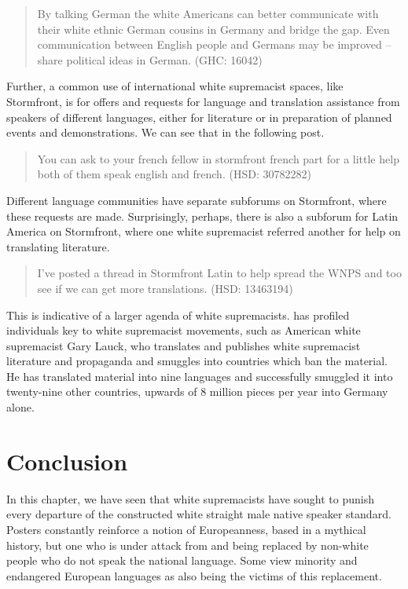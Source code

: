 \documentclass[output=paper,colorlinks,citecolor=brown]{langscibook}
\begin{document}
\begin{quote}
By talking German the white Americans can better communicate with their white ethnic German cousins in Germany and bridge the gap. Even communication between English people and Germans may be improved -- share political ideas in German. (GHC: 16042) 
\end{quote}

\noindent Further, a common use of international white supremacist spaces, like Stormfront, is for offers and requests for language and translation assistance from speakers of different languages, either for literature or in preparation of planned events and demonstrations. We can see that in the following post.

\begin{quote}
You can ask to your french fellow in stormfront french part for a little help both of them speak english and french. (HSD: 30782282) 
\end{quote}

\noindent Different language communities have separate subforums on Stormfront, where these requests are made. Surprisingly, perhaps, there is also a subforum for Latin America on Stormfront, where one white supremacist referred another for help on translating literature.

\begin{quote}
I've posted a thread in Stormfront Latin to help spread the WNPS and too see if we can get more translations. (HSD: 13463194) 
\end{quote}

\noindent This is indicative of a larger agenda of white supremacists. \citet{jp:SouthernPovertyLawCenter2022} has profiled individuals key to white supremacist movements, such as American white supremacist Gary Lauck, who translates and publishes white supremacist literature and propaganda and smuggles into countries which ban the material. He has translated material into nine languages and successfully smuggled it into twenty-nine other countries, upwards of 8 million pieces per year into Germany alone.


\section{Conclusion}

In this chapter, we have seen that white supremacists have sought to punish every departure of the constructed white straight male native speaker standard. Posters constantly reinforce a notion of Europeanness, based in a mythical history, but one who is under attack from and being replaced by non-white people who do not speak the national language. Some view minority and endangered European languages as also being the victims of this replacement.
\end{document}
